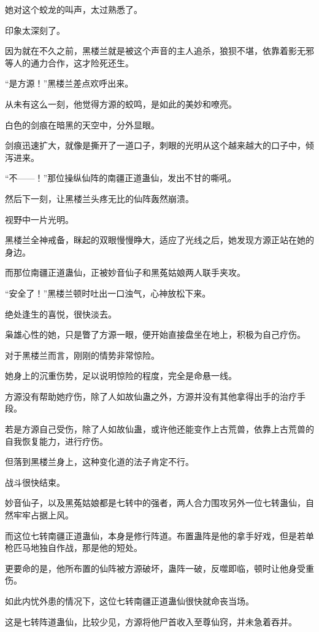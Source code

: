 \begin{this_body}
她对这个蛟龙的叫声，太过熟悉了。

印象太深刻了。

因为就在不久之前，黑楼兰就是被这个声音的主人追杀，狼狈不堪，依靠着影无邪等人的通力合作，这才险死还生。

“是方源！”黑楼兰差点欢呼出来。

从未有这么一刻，他觉得方源的蛟鸣，是如此的美妙和嘹亮。

白色的剑痕在暗黑的天空中，分外显眼。

剑痕迅速扩大，就像是撕开了一道口子，刺眼的光明从这个越来越大的口子中，倾泻进来。

“不——！”那位操纵仙阵的南疆正道蛊仙，发出不甘的嘶吼。

然后下一刻，让黑楼兰头疼无比的仙阵轰然崩溃。

视野中一片光明。

黑楼兰全神戒备，眯起的双眼慢慢睁大，适应了光线之后，她发现方源正站在她的身边。

而那位南疆正道蛊仙，正被妙音仙子和黑菟姑娘两人联手夹攻。

“安全了！”黑楼兰顿时吐出一口浊气，心神放松下来。

绝处逢生的喜悦，很快淡去。

枭雄心性的她，只是瞥了方源一眼，便开始直接盘坐在地上，积极为自己疗伤。

对于黑楼兰而言，刚刚的情势非常惊险。

她身上的沉重伤势，足以说明惊险的程度，完全是命悬一线。

方源没有帮助她疗伤，除了人如故仙蛊之外，方源并没有其他拿得出手的治疗手段。

若是方源自己受伤，除了人如故仙蛊，或许他还能变作上古荒兽，依靠上古荒兽的自我恢复能力，进行疗伤。

但落到黑楼兰身上，这种变化道的法子肯定不行。

战斗很快结束。

妙音仙子，以及黑菟姑娘都是七转中的强者，两人合力围攻另外一位七转蛊仙，自然牢牢占据上风。

而这位七转南疆正道蛊仙，本身是修行阵道。布置蛊阵是他的拿手好戏，但是若单枪匹马地独自作战，那是他的短处。

更要命的是，他所布置的仙阵被方源破坏，蛊阵一破，反噬即临，顿时让他身受重伤。

如此内忧外患的情况下，这位七转南疆正道蛊仙很快就命丧当场。

这是七转阵道蛊仙，比较少见，方源将他尸首收入至尊仙窍，并未急着吞并。


\end{this_body}
